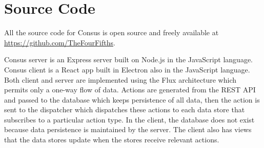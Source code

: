 \section{Source Code}
\label{app:source_code}

All the source code for Consus is open source and freely available at \url{https://github.com/TheFourFifths}.

Consus server is an Express server built on Node.js in the JavaScript language.
Consus client is a React app built in Electron also in the JavaScript language.
Both client and server are implemented using the Flux architecture which permits only a one-way flow of data.
Actions are generated from the REST API and passed to the database which keeps persistence of all data, then the action is sent to the dispatcher which dispatches these actions to each data store that subscribes to a particular action type.
In the client, the database does not exist because data persistence is maintained by the server.
The client also has views that the data stores update when the stores receive relevant actions.
